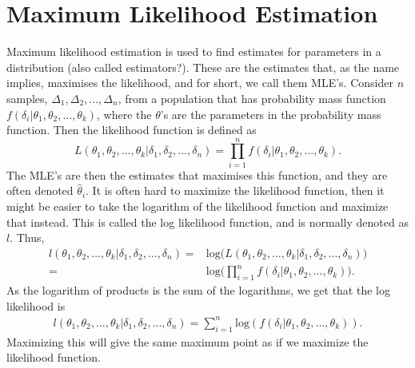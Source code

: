 \section{Maximum Likelihood Estimation}
\label{section_theory_mle}

Maximum likelihood estimation is used to find estimates for parameters in a distribution (also called estimators?). These are the estimates that, as the name implies, maximises the likelihood, and for short, we call them MLE's. Consider $n$ samples, $\Delta_1,\Delta_2,...,\Delta_n$, from a population that has probability mass function $f(\delta_i|\theta_1,\theta_2,...,\theta_k)$, where the $\theta$'s are the parameters in the probability mass function. Then the likelihood function is defined as
\begin{equation*}
    L(\theta_1,\theta_2,...,\theta_k|\delta_1,\delta_2,...,\delta_n) =  \prod_{i=1}^{n} f(\delta_i|\theta_1,\theta_2,...,\theta_k).
\end{equation*} 
The MLE's are then the estimates that maximises this function, and they are often denoted $\hat{\theta}_i$. It is often hard to maximize the likelihood function, then it might be easier to take the logarithm of the likelihood function and maximize that instead. This is called the log likelihood function, and is normally denoted as $l$. Thus,
\begin{equation*}
    \begin{aligned}
        l(\theta_1,\theta_2,...,\theta_k|\delta_1,\delta_2,...,\delta_n) 
        =& \text{log}\big(L(\theta_1,\theta_2,...,\theta_k|\delta_1,\delta_2,...,\delta_n)\big)\\
        =& \text{log}\big(\prod_{i=1}^{n} f(\delta_i|\theta_1,\theta_2,...,\theta_k) \big).
    \end{aligned}
\end{equation*}
As the logarithm of products is the sum of the logarithms, we get that the log likelihood is
\begin{equation*}
    \begin{aligned}
        l(\theta_1,\theta_2,...,\theta_k|\delta_1,\delta_2,...,\delta_n) = \sum_{i=1}^n \text{log}(f(\delta_i|\theta_1,\theta_2,...,\theta_k)).
    \end{aligned}
\end{equation*}
Maximizing this will give the same maximum point as if we maximize the likelihood function. 

